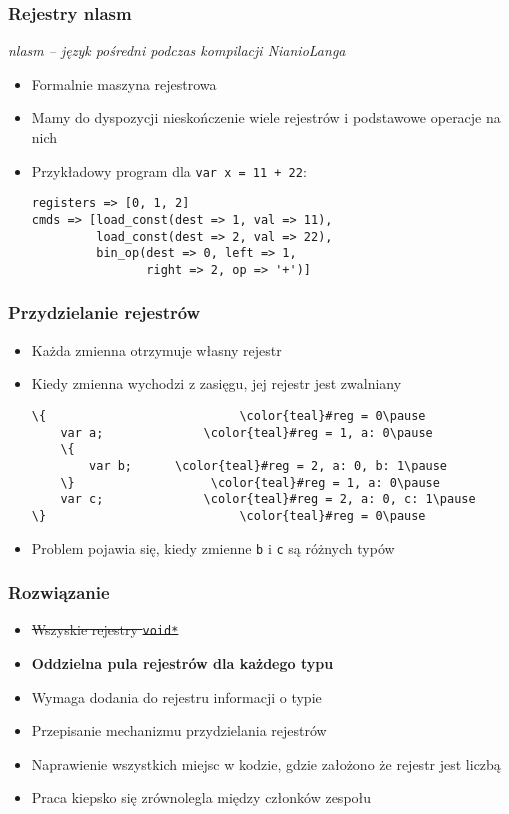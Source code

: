 \documentclass{beamer}
\begin{document}
	\begin{frame}[fragile]
		\frametitle{Rejestry nlasm}
		\textit{nlasm -- język pośredni podczas kompilacji NianioLanga}
		\begin{itemize}
		 \item Formalnie maszyna rejestrowa
		 \item Mamy do dyspozycji nieskończenie wiele rejestrów i podstawowe operacje na nich
		 \item Przykładowy program dla \texttt{var x = 11 + 22}:
		 \begin{Verbatim}
registers => [0, 1, 2]
cmds => [load_const(dest => 1, val => 11),
         load_const(dest => 2, val => 22),
         bin_op(dest => 0, left => 1,
                right => 2, op => '+')]
		 \end{Verbatim}
		\end{itemize}
	\end{frame}

	\begin{frame}[fragile]
		\frametitle{Przydzielanie rejestrów}
		\begin{itemize}
		\item Każda zmienna otrzymuje własny rejestr
		\item Kiedy zmienna wychodzi z zasięgu, jej rejestr jest zwalniany\pause
		\begin{Verbatim}[commandchars=\\\{\}]
\{                           \color{teal}#reg = 0\pause
	var a;              \color{teal}#reg = 1, a: 0\pause
	\{        
		var b;      \color{teal}#reg = 2, a: 0, b: 1\pause
	\}                   \color{teal}#reg = 1, a: 0\pause
	var c;              \color{teal}#reg = 2, a: 0, c: 1\pause
\}                           \color{teal}#reg = 0\pause
		\end{Verbatim}
		\item Problem pojawia się, kiedy zmienne \texttt{b} i \texttt{c} są różnych typów
		\end{itemize}
	\end{frame}
	
	\begin{frame}
		\frametitle{Rozwiązanie}
		\begin{itemize}
			\item \sout{Wszyskie rejestry \texttt{void*}}
			\item \textbf{Oddzielna pula rejestrów dla każdego typu}
			\item Wymaga dodania do rejestru informacji o typie
			\item Przepisanie mechanizmu przydzielania rejestrów
			\item Naprawienie wszystkich miejsc w kodzie, gdzie założono że rejestr jest liczbą
			\item Praca kiepsko się zrównolegla między członków zespołu
		\end{itemize}
	\end{frame}
	
\end{document}
